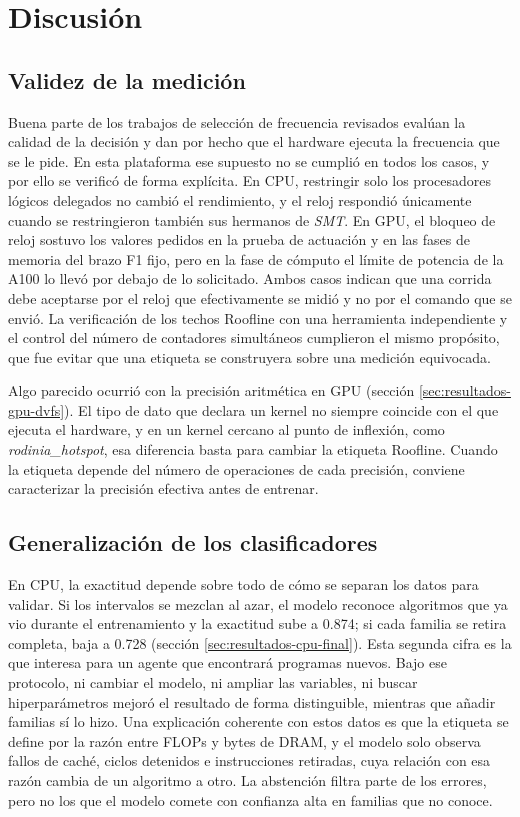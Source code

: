 \chapter{Discusión}

\section{Validez de la medición}

Buena parte de los trabajos de selección de frecuencia revisados \cite{Ali2023,Guerreiro2019,Wang2024} evalúan la calidad de la decisión y dan por hecho que el hardware ejecuta la frecuencia que se le pide. En esta plataforma ese supuesto no se cumplió en todos los casos, y por ello se verificó de forma explícita. En CPU, restringir solo los procesadores lógicos delegados no cambió el rendimiento, y el reloj respondió únicamente cuando se restringieron también sus hermanos de \textit{SMT}. En GPU, el bloqueo de reloj sostuvo los valores pedidos en la prueba de actuación y en las fases de memoria del brazo F1 fijo, pero en la fase de cómputo el límite de potencia de la A100 lo llevó por debajo de lo solicitado. Ambos casos indican que una corrida debe aceptarse por el reloj que efectivamente se midió y no por el comando que se envió. La verificación de los techos Roofline con una herramienta independiente y el control del número de contadores simultáneos cumplieron el mismo propósito, que fue evitar que una etiqueta se construyera sobre una medición equivocada.

Algo parecido ocurrió con la precisión aritmética en GPU (sección \ref{sec:resultados-gpu-dvfs}). El tipo de dato que declara un kernel no siempre coincide con el que ejecuta el hardware, y en un kernel cercano al punto de inflexión, como \textit{rodinia\_hotspot}, esa diferencia basta para cambiar la etiqueta Roofline. Cuando la etiqueta depende del número de operaciones de cada precisión, conviene caracterizar la precisión efectiva antes de entrenar.

\section{Generalización de los clasificadores}

En CPU, la exactitud depende sobre todo de cómo se separan los datos para validar. Si los intervalos se mezclan al azar, el modelo reconoce algoritmos que ya vio durante el entrenamiento y la exactitud sube a 0.874; si cada familia se retira completa, baja a 0.728 (sección \ref{sec:resultados-cpu-final}). Esta segunda cifra es la que interesa para un agente que encontrará programas nuevos. Bajo ese protocolo, ni cambiar el modelo, ni ampliar las variables, ni buscar hiperparámetros mejoró el resultado de forma distinguible, mientras que añadir familias sí lo hizo. Una explicación coherente con estos datos es que la etiqueta se define por la razón entre FLOPs y bytes de DRAM, y el modelo solo observa fallos de caché, ciclos detenidos e instrucciones retiradas, cuya relación con esa razón cambia de un algoritmo a otro. La abstención filtra parte de los errores, pero no los que el modelo comete con confianza alta en familias que no conoce.

